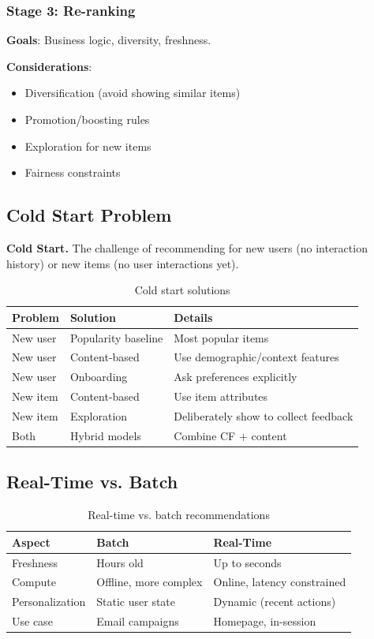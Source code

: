 \subsubsection{Stage 3: Re-ranking}

\textbf{Goals}: Business logic, diversity, freshness.

\textbf{Considerations}:
\begin{itemize}
    \item Diversification (avoid showing similar items)
    \item Promotion/boosting rules
    \item Exploration for new items
    \item Fairness constraints
\end{itemize}

\subsection{Cold Start Problem}

\textbf{Cold Start.} The challenge of recommending for new users (no interaction history) or new items (no user interactions yet).

\begin{table}[H]
\centering
\caption{Cold start solutions}
\begin{tabularx}{\textwidth}{lXX}
\toprule
\textbf{Problem} & \textbf{Solution} & \textbf{Details} \\
\midrule
New user & Popularity baseline & Most popular items \\
New user & Content-based & Use demographic/context features \\
New user & Onboarding & Ask preferences explicitly \\
New item & Content-based & Use item attributes \\
New item & Exploration & Deliberately show to collect feedback \\
Both & Hybrid models & Combine CF + content \\
\bottomrule
\end{tabularx}
\end{table}

\subsection{Real-Time vs. Batch}

\begin{table}[H]
\centering
\caption{Real-time vs. batch recommendations}
\begin{tabularx}{\textwidth}{lXX}
\toprule
\textbf{Aspect} & \textbf{Batch} & \textbf{Real-Time} \\
\midrule
Freshness & Hours old & Up to seconds \\
Compute & Offline, more complex & Online, latency constrained \\
Personalization & Static user state & Dynamic (recent actions) \\
Use case & Email campaigns & Homepage, in-session \\
\bottomrule
\end{tabularx}
\end{table}

